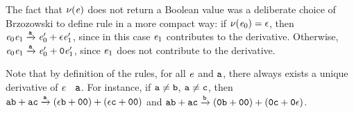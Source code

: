 The fact that $\nu({\mathit {e}})$ does not return a Boolean value was a deliberate choice of Brzozowski to define rule  in a more compact way:
if $\nu({\mathit {e}_0})=\mathtt {\epsilon}$, then $\mathit {e}_0\mathit {e}_1\xrightarrow{\mathtt {a}}\mathit {e}'_0\mathbin{+}\mathtt {\epsilon}\mathit {e}_1'$, since in this case $\mathit {e}_1$ contributes to the
derivative. Otherwise, $\mathit {e}_0\mathit {e}_1\xrightarrow{\mathtt {a}}\mathit {e}'_0\mathbin{+}\mathtt {0}\mathit {e}_1'$, since $\mathit {e}_1$ does not contribute to the
derivative.

Note that by definition of the rules, for all $\mathit {e}$ and $\mathtt {a}$, there always exists a unique derivative of $\mathit {e}$ \wrt~$\mathtt {a}$.
For instance, if $\mathtt {a}\neq\mathtt {b}$, $\mathtt {a}\neq\mathtt {c}$, then
$\mathtt {a} \mathtt {b} \mathbin{+} \mathtt {a}\mathtt {c}\xrightarrow{\mathtt {a}}(\mathtt {\epsilon}\mathtt {b}\mathbin{+}\mathtt {0}\mathtt {0})\mathbin{+}(\mathtt {\epsilon}\mathtt {c}\mathbin{+}\mathtt {0}\mathtt {0})$ and $\mathtt {a} \mathtt {b} \mathbin{+} \mathtt {a} \mathtt {c}\xrightarrow{\mathtt {b}}(\mathtt {0}\mathtt {b}\mathbin{+}\mathtt {0}\mathtt {0})\mathbin{+}(\mathtt {0}\mathtt {c}\mathbin{+}\mathtt {0}\mathtt {\epsilon})$.
